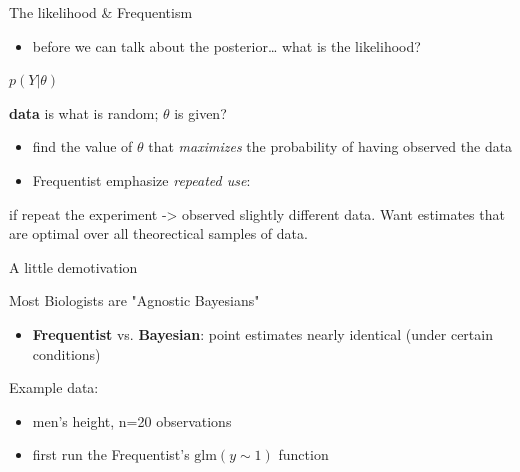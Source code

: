 \documentclass[presentation]{beamer}
\begin{document}
\begin{frame}[label=sec-6]{The likelihood \& Frequentism}
\begin{itemize}
\item before we can talk about the posterior\ldots{} what is the likelihood?
\end{itemize}
\begin{center}
$p(Y \vert \theta)$
\end{center}
\textbf{data} is what is random; $\theta$ is given?
\begin{itemize}
\item find the value of $\theta$ that \emph{maximizes} the probability of having observed the data
\item Frequentist emphasize \emph{repeated use}:
\end{itemize}
if repeat the experiment -> observed slightly different data.  Want estimates that are optimal over all theorectical samples of data.
\end{frame}

\begin{frame}[label=sec-7]{A little demotivation}
\begin{block}{Most Biologists are "Agnostic Bayesians"}
\begin{itemize}
\item \textbf{Frequentist} vs. \textbf{Bayesian}: point estimates nearly identical (under certain conditions)
\end{itemize}
\end{block}

\begin{block}{Example data:}
\begin{itemize}
\item men's height, n=20 observations
\item first run the Frequentist's $\text{glm}(y\sim1)$ function
\end{itemize}
\end{block}
\end{frame}
\end{document}

